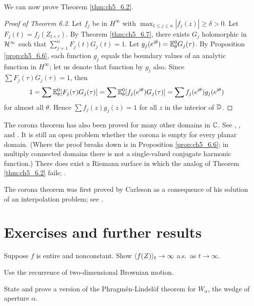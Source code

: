 
We can now prove Theorem \ref{thm:ch5_6.2}.

\begin{proof}[Proof of Theorem 6.2]
Let $f_j$ be in $H^\infty$ with $\max_{1\leq j\leq n}|f_j(z)| \geq \delta > 0$. Let $F_j(t) = f_j(Z_{t\wedge\tau})$. By Theorem \ref{thm:ch5_6.7}, there exists $G_j$ holomorphic in $\mathcal{H}^\infty$ such that $\sum_{j=1}^n F_j(t)G_j(t) = 1$. Let $g_j(e^{\mathrm{i}\theta}) = \mathbb{E}_\theta^0G_j(\tau)$. By Proposition \ref{prop:ch5_6.6}, each function $g_j$ equals the boundary values of an analytic function in $H^\infty$; let us denote that function by $g_j$ also. Since $\sum F_j(\tau)G_j(\tau) = 1$, then
\[
    1=\sum \mathbb{E}_\theta^0[F_j(\tau)G_j(\tau)] = \sum \mathbb{E}_\theta^0[f_j(e^{\mathrm{i}\theta})G_j(\tau)] = \sum f_j(e^{\mathrm{i}\theta})g_j(e^{\mathrm{i}\theta})
\]
for almost all $\theta$. Hence $\sum f_j(z)g_j(z) = 1$ for all $z$ in the interior of $\mathbb{D}$.
\end{proof}

The corona theorem has also been proved for many other domains in $\mathbb{C}$. See \cite{Behrens1970,Behrens1971}, \cite{JonesMarshall1985}, and \cite{GarnettJones1985}. It is still an open problem whether the corona is empty for every planar domain. (Where the proof breaks down is in Proposition \ref{prop:ch5_6.6}; in multiply connected domains there is not a single-valued conjugate harmonic function.) There does exist a Riemann surface in which the analog of Theorem \ref{thm:ch5_6.2} fails; \cite[see][Chap.~4]{Gamelin1978}.

The corona theorem was first proved by Carleson as a consequence of his solution of an interpolation problem; see \cite{Carleson1962}.

\section{Exercises and further results}\label{ch5_sec7}

\begin{exercise}\label{ex:ch5_1}
Suppose $f$ is entire and nonconstant. Show $\langle f(Z) \rangle_t \to \infty$ a.s.\ as $t \to \infty$.

\hint Use the recurrence of two-dimensional Brownian motion.
\end{exercise}

\begin{exercise}\label{ex:ch5_2}
State and prove a version of the Phragm\'en-Lindel\"of theorem for $W_\alpha$, the wedge of aperture $\alpha$.
\end{exercise}

